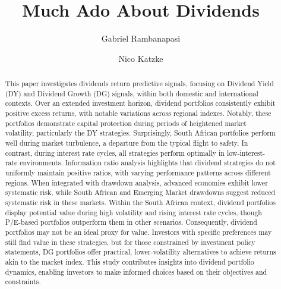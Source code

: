 \documentclass[11pt,preprint, authoryear]{elsarticle}
\numberwithin{equation}{section}
\numberwithin{figure}{section}
\numberwithin{table}{section}
\begin{document}
\begin{frontmatter}  %

\title{Much Ado About Dividends}





\author[Add1]{Gabriel Rambanapasi}

\author[Add2]{Nico Katzke}
\ead{}




\address[Add1]{Stellenbosch University, Cape Town, South Africa}
\address[Add2]{Satrix, Cape Town, South Africa}


\begin{abstract}
\small{
This paper investigates dividends return predictive signals, focusing on
Dividend Yield (DY) and Dividend Growth (DG) signals, within both
domestic and international contexts. Over an extended investment
horizon, dividend portfolios consistently exhibit positive excess
returns, with notable variations across regional indexes. Notably, these
portfolios demonstrate capital protection during periods of heightened
market volatility, particularly the DY strategies. Surprisingly, South
African portfolios perform well during market turbulence, a departure
from the typical flight to safety. In contrast, during interest rate
cycles, all strategies perform optimally in low-interest-rate
environments. Information ratio analysis highlights that dividend
strategies do not uniformly maintain positive ratios, with varying
performance patterns across different regions. When integrated with
drawdown analysis, advanced economies exhibit lower systematic risk,
while South African and Emerging Market drawdowns suggest reduced
systematic risk in these markets. Within the South African context,
dividend portfolios display potential value during high volatility and
rising interest rate cycles, though P/E-based portfolios outperform them
in other scenarios. Consequently, dividend portfolios may not be an
ideal proxy for value. Investors with specific preferences may still
find value in these strategies, but for those constrained by investment
policy statements, DG portfolios offer practical, lower-volatility
alternatives to achieve returns akin to the market index. This study
contributes insights into dividend portfolio dynamics, enabling
investors to make informed choices based on their objectives and
constraints.
}
\end{abstract}

\vspace{1cm}





\vspace{0.5cm}

\end{frontmatter}
\end{document}
